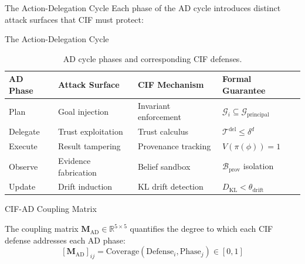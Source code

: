 \documentclass[
  ignorenonframetext,
]{beamer}
\begin{document}
\begin{frame}[allowframebreaks]{The Action-Delegation Cycle}
Each phase of the AD cycle introduces distinct attack surfaces that CIF
must protect:

\end{frame}

\begin{frame}[allowframebreaks]{The Action-Delegation Cycle}
\begin{table}[htbp]
\centering
\caption{AD cycle phases and corresponding CIF defenses.}
\label{tab:ad-cif-mapping}
\begin{tabular}{@{}lllp{4cm}@{}}
\toprule
AD Phase & Attack Surface & CIF Mechanism & Formal Guarantee \\
\midrule
Plan & Goal injection & Invariant enforcement & $\mathcal{G}_i \subseteq \mathcal{G}_{\text{principal}}$ \\
Delegate & Trust exploitation & Trust calculus & $\mathcal{T}^{\text{del}} \leq \delta^d$ \\
Execute & Result tampering & Provenance tracking & $V(\pi(\phi)) = 1$ \\
Observe & Evidence fabrication & Belief sandbox & $\mathcal{B}_{\text{prov}}$ isolation \\
Update & Drift induction & KL drift detection & $D_{\text{KL}} < \theta_{\text{drift}}$ \\
\bottomrule
\end{tabular}
\end{table}
\end{frame}

\begin{frame}[allowframebreaks]{CIF-AD Coupling Matrix}
\protect{}\label{cif-ad-coupling-matrix}
\begin{definition}
\label{def:cif-ad-matrix}
The coupling matrix $\mathbf{M}_{\text{AD}} \in \mathbb{R}^{5 \times 5}$ quantifies the degree to which each CIF defense addresses each AD phase:
\begin{equation}
\label{eq:cif-ad-matrix}
[\mathbf{M}_{\text{AD}}]_{ij} = \text{Coverage}(\text{Defense}_i, \text{Phase}_j) \in [0,1]
\end{equation}
\end{definition}

\end{frame}
\end{document}
